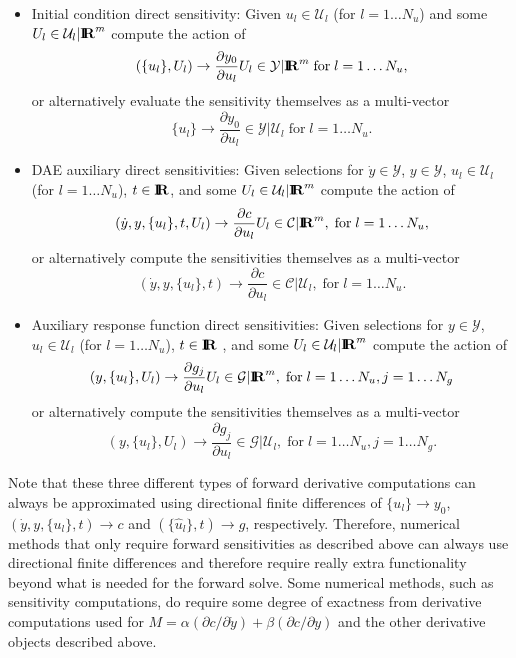 \documentclass[pdf,ps2pdf,11pt]{SANDreport}
\begin{document}
\begin{itemize}

{}\item Initial condition direct sensitivity: Given $u_l\in\mathcal{U}_l$ (for
$l=1\ldots{}N_u$) and some $U_l\in\mathcal{U}_l|\mbox{\textbf{I}}\hspace{-0.6ex}\mbox{\textbf{R}}^m$ compute the action of
\[
(\{u_l\},U_l) {}\rightarrow \frac{\partial y_0}{\partial u_l} U_l \in \mathcal{Y}|\mbox{\textbf{I}}\hspace{-0.6ex}\mbox{\textbf{R}}^m
\; \mbox{for} \; l = 1 {}\ldots N_u,
\]
or alternatively evaluate the sensitivity themselves as a multi-vector
\[
\{u_l\} {}\rightarrow \frac{\partial y_0}{\partial u_l} \in \mathcal{Y}|\mathcal{U}_l
\; \mbox{for} \; l = 1 {}\ldots N_u.
\]

{}\item DAE auxiliary direct sensitivities: Given selections for
$\dot{y}\in\mathcal{Y}$, $y\in\mathcal{Y}$, $u_l\in\mathcal{U}_l$ (for
$l=1\ldots{}N_u$), $t\in\mbox{\textbf{I}}\hspace{-0.6ex}\mbox{\textbf{R}}$, and some $U_l\in\mathcal{U}_l|\mbox{\textbf{I}}\hspace{-0.6ex}\mbox{\textbf{R}}^m$ compute
the action of
\[
(\dot{y},y,\{u_l\},t,U_l) {}\rightarrow \frac{\partial c}{\partial u_l} U_l \in \mathcal{C}|\mbox{\textbf{I}}\hspace{-0.6ex}\mbox{\textbf{R}}^m,
\; \mbox{for} \; l = 1 {}\ldots N_u,
\]
or alternatively compute the sensitivities themselves as a multi-vector
\[
(\dot{y},y,\{u_l\},t) {}\rightarrow \frac{\partial c}{\partial u_l} \in \mathcal{C}|\mathcal{U}_l,
\; \mbox{for} \; l = 1 {}\ldots N_u.
\]

{}\item Auxiliary response function direct sensitivities: Given selections for
$y\in\mathcal{Y}$, $u_l\in\mathcal{U}_l$ (for $l=1\ldots{}N_u$), $t\in\mbox{\textbf{I}}\hspace{-0.6ex}\mbox{\textbf{R}}$ ,
and some $U_l\in\mathcal{U}_l|\mbox{\textbf{I}}\hspace{-0.6ex}\mbox{\textbf{R}}^m$ compute the action of
\[
(y,\{u_l\},U_l) {}\rightarrow \frac{\partial g_j}{\partial u_l} U_l \in \mathcal{G}|\mbox{\textbf{I}}\hspace{-0.6ex}\mbox{\textbf{R}}^m,
\; \mbox{for} \; l = 1 {}\ldots N_u, j = 1 \ldots N_g
\]
or alternatively compute the sensitivities themselves as a multi-vector
\[
(y,\{u_l\},U_l) {}\rightarrow \frac{\partial g_j}{\partial u_l} \in \mathcal{G}|\mathcal{U}_l,
\; \mbox{for} \; l = 1 {}\ldots N_u, j = 1 \ldots N_g.
\]

\end{itemize}

Note that these three different types of forward derivative computations can
always be approximated using directional finite differences of $\{u_l\}
{}\rightarrow y_0$, $(\dot{y},y,\{u_l\},t) {}\rightarrow c$ and
$(\{\hat{u}_l\},t) {}\rightarrow g$, respectively.  Therefore, numerical
methods that only require forward sensitivities as described above can always
use directional finite differences and therefore require really extra
functionality beyond what is needed for the forward solve.  Some numerical
methods, such as sensitivity computations, do require some degree of exactness
from derivative computations used for $M = {}\alpha ({}\partial c / {}\partial
{}\dot{y}) + {}\beta ({}\partial c / {}\partial y)$ and the other derivative
objects described above.
\end{document}

